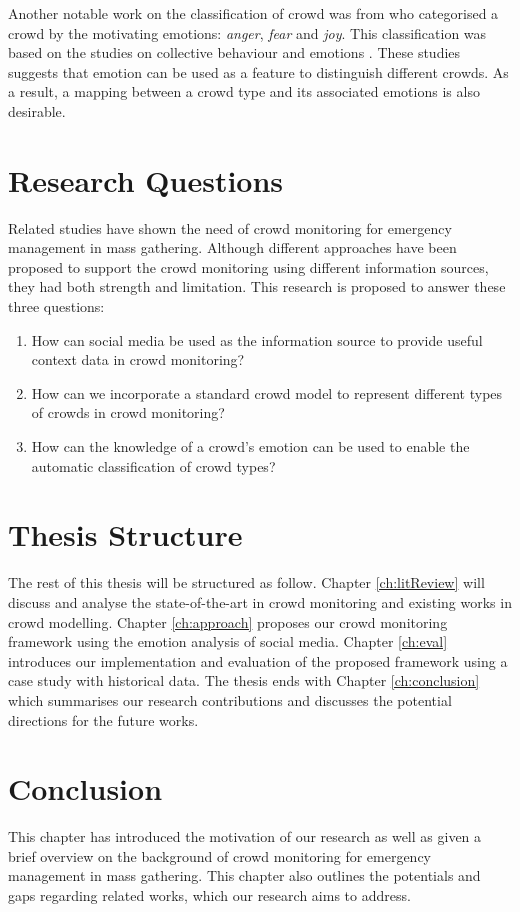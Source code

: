 Another notable work on the classification of crowd was from \citet{Lofland1985} who categorised a crowd by the motivating emotions: \textit{anger}, \textit{fear} and \textit{joy}. This classification was based on the studies on collective behaviour and emotions \citep{Lofland1985,Smelser1998,Brown1954}. These studies suggests that emotion can be used as a feature to distinguish different crowds. As a result, a mapping between a crowd type and its associated emotions is also desirable. 

\section{Research Questions}
Related studies have shown the need of crowd monitoring for emergency management in mass gathering. Although different approaches have been proposed to support the crowd monitoring using different information sources, they had both strength and limitation. This research is proposed to answer these three questions:
\begin{enumerate}
\item How can social media be used as the information source to provide useful context data in crowd monitoring?
\item How can we incorporate a standard crowd model to represent different types of crowds in crowd monitoring?
\item How can the knowledge of a crowd's emotion can be used to enable the automatic classification of crowd types?
\end{enumerate}

\section{Thesis Structure}
The rest of this thesis will be structured as follow. Chapter \ref{ch:litReview} will discuss and analyse the state-of-the-art in crowd monitoring and existing works in crowd modelling. Chapter \ref{ch:approach} proposes our crowd monitoring framework using the emotion analysis of social media. Chapter \ref{ch:eval} introduces our implementation and evaluation of the proposed framework using a case study with historical data. The thesis ends with Chapter \ref{ch:conclusion} which summarises our research contributions and discusses the potential directions for the future works.

\section{Conclusion}
This chapter has introduced the motivation of our research as well as given a brief overview on the background of crowd monitoring for emergency management in mass gathering. This chapter also outlines the potentials and gaps regarding related works, which our research aims to address.